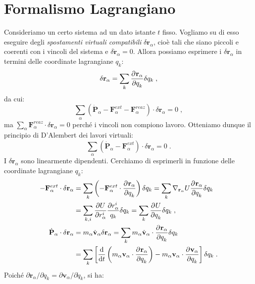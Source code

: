 \section{Formalismo Lagrangiano}
Consideriamo un certo sistema ad un dato istante $t$ fisso. Vogliamo su di esso eseguire degli \textit{spostamenti virtuali compatibili} $\delta\mathbf{r}_{\alpha}$, cioè tali che siano piccoli e coerenti con i vincoli del sistema e $\delta\dot{\mathbf{r}}_{\alpha}=0$. Allora possiamo esprimere i $\delta\mathbf{r}_{\alpha}$ in termini delle coordinate lagrangiane $q_k$:
\begin{equation}
\delta\mathbf{r}_{\alpha}=\sum_k \frac{\partial^{}\mathbf{r}_{\alpha}}{\partial q_k^{}}\delta q_k\;,
\end{equation}
da cui:
\begin{equation}
\sum_{\alpha} (\dot{\mathbf{P}}_{\alpha}-\mathbf{F}_{\alpha}^{ext}-\mathbf{F}_{\alpha}^{reaz})\cdot \delta\mathbf{r}_{\alpha}=0\;,
\end{equation}
ma $\sum_{\alpha}\mathbf{F}_{\alpha}^{reaz}\cdot\delta\mathbf{r}_{\alpha}=0$ perché i vincoli non compiono lavoro. Otteniamo dunque il principio di D'Alembert dei lavori virtuali:
\begin{equation}
\sum_{\alpha}(\dot{\mathbf{P}}_{\alpha}-\mathbf{F}_{\alpha}^{ext})\cdot\delta\mathbf{r}_{\alpha}=0\;.
\end{equation}
I $\delta\mathbf{r}_{\alpha}$ sono linearmente dipendenti. Cerchiamo di esprimerli in funzione delle coordinate lagrangiane $q_k$:
\begin{align}
-\mathbf{F}^{ext}_{\alpha}\cdot\delta\mathbf{r}_{\alpha} &= \sum_k\left(-\mathbf{F}^{ext}_{\alpha}\cdot \frac{\partial^{}\mathbf{r}_{\alpha}}{\partial q_k^{}}\right)\delta q_k=\sum_k \nabla_{\mathbf{r}_{\alpha}}U\frac{\partial^{}\mathbf{r}_{\alpha}}{\partial q_k^{}}\delta q_k \notag \\
&=\sum_{k,i}\frac{\partial U}{\partial r_{\alpha}^i}\frac{\partial r_{\alpha}^i}{q_k}\delta q_k=\sum_k\frac{\partial^{}U}{\partial q_k^{}}\delta q_k\;, \\
\dot{\mathbf{P}}_{\alpha}\cdot\delta\mathbf{r}_{\alpha} &= m_{\alpha}\dot{\mathbf{v}}_{\alpha}\delta\mathbf{r}_{\alpha}=\sum_k m_{\alpha}\dot{\mathbf{v}}_{\alpha}\cdot \frac{\partial^{}\mathbf{r}_{\alpha}}{\partial q_k^{}}\delta q_k \notag \\
&=\sum_k\left[\frac{\mathrm{d}}{\mathrm{d}{t}}\left(m_{\alpha}\mathbf{v}_{\alpha}\cdot\frac{\partial^{}\mathbf{r}_{\alpha}}{\partial q_k^{}}\right)-m_{\alpha}\mathbf{v}_{\alpha}\cdot\frac{\partial^{}\mathbf{v}_{\alpha}}{\partial q_k^{}}\right]\delta q_k\;.
\end{align}
Poiché $\partial\mathbf{r}_{\alpha}/\partial q_k=\partial\mathbf{v}_{\alpha}/\partial\dot{q}_k$, si ha:
